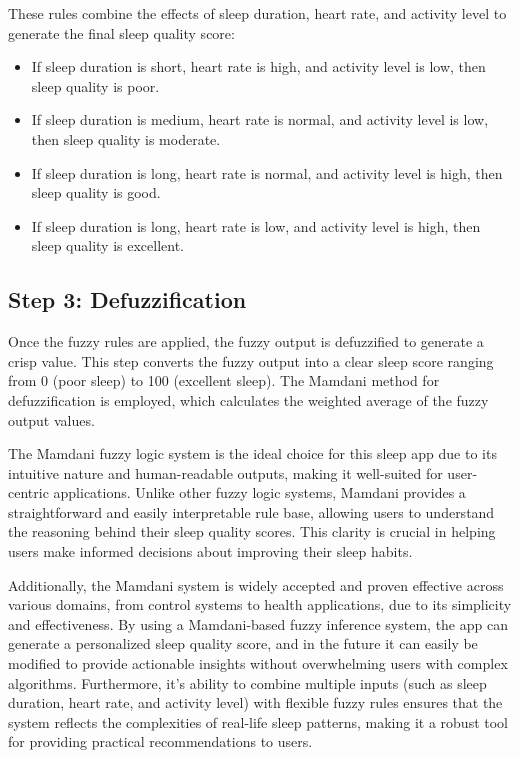 \documentclass[10pt,twocolumn]{article}
\begin{document}
\begin{enumerate}
    These rules combine the effects of sleep duration, heart rate, and activity level to generate the final sleep quality score:
        \begin{itemize}
            \item If sleep duration is short, heart rate is high, and activity level is low, then sleep quality is poor.
            \item If sleep duration is medium, heart rate is normal, and activity level is low, then sleep quality is moderate.
            \item If sleep duration is long, heart rate is normal, and activity level is high, then sleep quality is good.
            \item If sleep duration is long, heart rate is low, and activity level is high, then sleep quality is excellent.
        \end{itemize}
\end{enumerate}


\subsection{Step 3: Defuzzification}
Once the fuzzy rules are applied, the fuzzy output is defuzzified to generate a crisp value. This step converts the fuzzy output into a clear sleep score ranging from 0 (poor sleep) to 100 (excellent sleep). The Mamdani method for defuzzification is employed, which calculates the weighted average of the fuzzy output values.

The Mamdani fuzzy logic system is the ideal choice for this sleep app due to its intuitive nature and human-readable outputs, making it well-suited for user-centric applications\cite{mamdani-system}. Unlike other fuzzy logic systems, Mamdani provides a straightforward and easily interpretable rule base, allowing users to understand the reasoning behind their sleep quality scores. This clarity is crucial in helping users make informed decisions about improving their sleep habits.

Additionally, the Mamdani system is widely accepted and proven effective across various domains, from control systems to health applications, due to its simplicity and effectiveness. By using a Mamdani-based fuzzy inference system, the app can generate a personalized sleep quality score, and in the future it can easily be modified to provide actionable insights without overwhelming users with complex algorithms. Furthermore, it's ability to combine multiple inputs (such as sleep duration, heart rate, and activity level) with flexible fuzzy rules ensures that the system reflects the complexities of real-life sleep patterns, making it a robust tool for providing practical recommendations to users.
\end{document}
